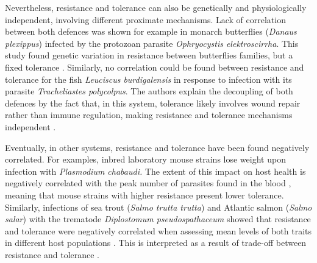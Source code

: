 \documentclass[12pt]{article}
\begin{document}
Nevertheless, resistance and tolerance can also be genetically and physiologically independent, involving different proximate mechanisms. Lack of correlation between both defences was shown for example in monarch butterflies (\textit{Danaus plexippus}) infected by the protozoan parasite \textit{Ophryocystis elektroscirrha}. This study found genetic variation in resistance between butterflies families, but a fixed tolerance \citep{Lefvre2010}. Similarly, no correlation could be found between resistance and tolerance for the fish \textit{Leuciscus burdigalensis} in response to infection with its parasite \textit{Tracheliastes polycolpus}. The authors explain the decoupling of both defences by the fact that, in this system, tolerance likely involves wound repair rather than immune regulation, making resistance and tolerance mechanisms independent \citep{MazGuilmo2014}.\par

Eventually, in other systems, resistance and tolerance have been found negatively correlated. For examples, inbred laboratory mouse strains lose weight upon infection with \textit{Plasmodium chabaudi.} The extent of this impact on host health is negatively correlated with the peak number of parasites found in the blood \citep{raaberg_disentangling_2007}, meaning that mouse strains with higher resistance present lower tolerance. Similarly, infections of sea trout (\textit{Salmo trutta trutta}) and Atlantic salmon (\textit{Salmo salar}) with the trematode \textit{Diplostomum pseudospathaceum} showed that resistance and tolerance were negatively correlated when assessing mean levels of both traits in different host populations \citep{klemme_vertebrate_2016}. This is interpreted as a result of trade-off between resistance and tolerance \citep{sheldon_ecological_1996, restif_concurrent_2004, raaberg_decomposing_2009}.\par
\end{document}
